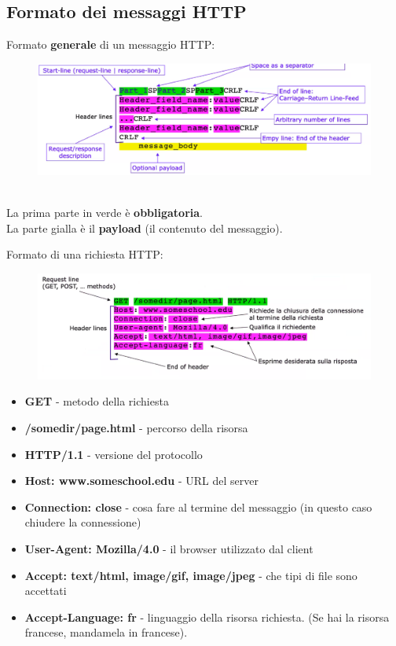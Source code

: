 \documentclass[12pt, a4paper]{article}
\begin{document}
    \newpage
    \subsection{Formato dei messaggi HTTP}

    Formato \textbf{generale} di un messaggio HTTP:
    \begin{figure}[htbp]
        \centering
        \includegraphics[scale=0.5]{httpgeneral.png}
    \end{figure}
    \\La prima parte in verde è \textbf{obbligatoria}.
    \\La parte gialla è il \textbf{payload} (il contenuto del messaggio).

    Formato di una richiesta HTTP:
    \begin{figure}[htbp]
        \centering
        \includegraphics[scale=0.5]{httprequest.png}
    \end{figure}
    
    \begin{itemize}
        \item \textbf{GET} - metodo della richiesta
        \item \textbf{/somedir/page.html} - percorso della risorsa
        \item \textbf{HTTP/1.1} - versione del protocollo
        \item \textbf{Host: www.someschool.edu} - URL del server
        \item \textbf{Connection: close} - cosa fare al termine del messaggio (in questo caso chiudere la connessione)
        \item \textbf{User-Agent: Mozilla/4.0} - il browser utilizzato dal client
        \item \textbf{Accept: text/html, image/gif, image/jpeg} - che tipi di file sono accettati
        \item \textbf{Accept-Language: fr} - linguaggio della risorsa richiesta. (Se hai la risorsa francese, mandamela in francese).
    \end{itemize}
\end{document}
